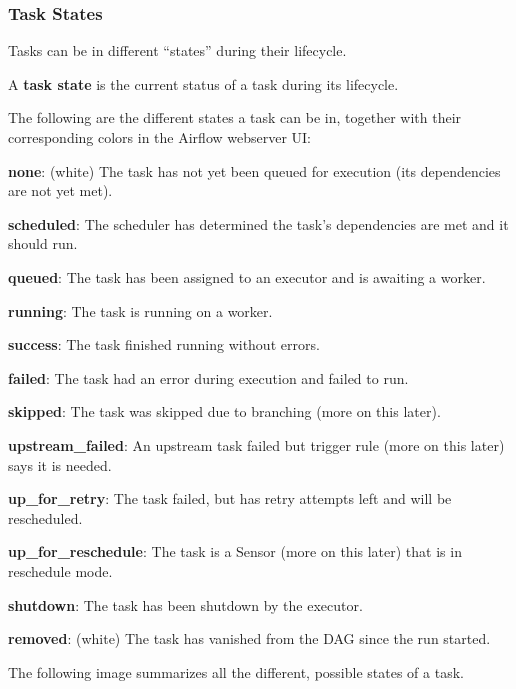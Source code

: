 \subsubsection{Task States}

Tasks can be in different ``states'' during their lifecycle.

A \textbf{task state} is the current status of a task during its lifecycle.
\ed

The following are the different states a task can be in, together with their corresponding colors in the Airflow
webserver UI:
\bit
\item \textbf{none}: (white) The task has not yet been queued for execution (its dependencies are not yet met).
\item \textbf{\textcolor{scheduled}{scheduled}}: The scheduler has determined the task's dependencies are met and it
should run.
\item \textbf{\textcolor{queued}{queued}}: The task has been assigned to an executor and is awaiting a worker.
\item \textbf{\textcolor{running}{running}}: The task is running on a worker.
\item \textbf{\textcolor{success}{success}}: The task finished running without errors.
\item \textbf{\textcolor{failed}{failed}}: The task had an error during execution and failed to run.
\item \textbf{\textcolor{skipped}{skipped}}: The task was skipped due to branching (more on this later).
\item \textbf{\textcolor{upstream_failed}{upstream\_failed}}: An upstream task failed but trigger rule (more on this
later) says it is needed.
\item \textbf{\textcolor{up_for_retry}{up\_for\_retry}}: The task failed, but has retry attempts left and will be
rescheduled.
\item \textbf{\textcolor{up_for_reschedule}{up\_for\_reschedule}}: The task is a Sensor (more on this later) that is in
reschedule mode.
\item \textbf{\textcolor{shutdown}{shutdown}}: The task has been shutdown by the executor.
\item \textbf{removed}: (white) The task has vanished from the DAG since the run started.
\eit

The following image summarizes all the different, possible states of a task.


